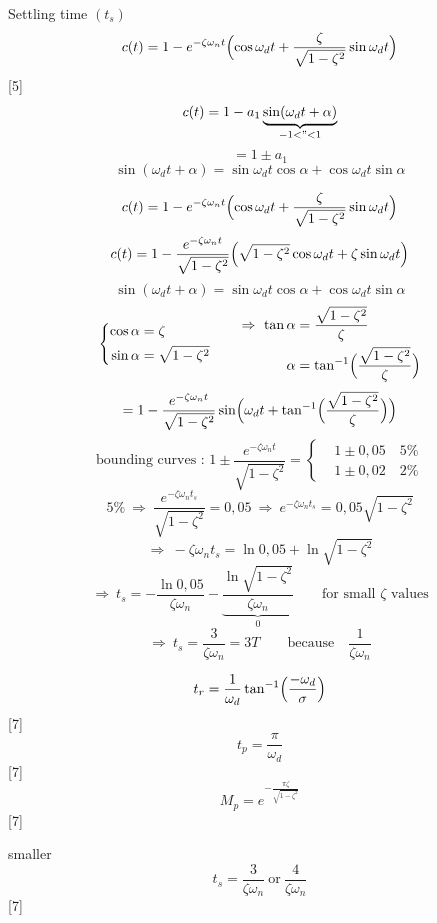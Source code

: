 \documentclass[11pt,a4paper]{article}
\begin{document}
Settling time $(t_s)$
\[ c(t)=1-e^{-\zeta\omega_n t}\Bigl(\cos\omega_d t+\frac{\zeta}{\sqrt{1-\zeta^2}}\sin\omega_d t\Bigr) \]
[5]
\[ c(t)=1-a_1\underbrace{\sin(\omega_d t+\alpha)}_{-1<\text{\textquotedblright}<1} \]
\[ =1\pm a_1 \]
\[ \sin(\omega_d t+\alpha)=\sin\omega_d t\cos\alpha+\cos\omega_d t\sin\alpha \]

\[ c(t)=1-e^{-\zeta\omega_n t}\Bigl(\cos\omega_d t+\frac{\zeta}{\sqrt{1-\zeta^2}}\sin\omega_d t\Bigr) \]
\[ c(t)=1-\frac{e^{-\zeta\omega_n t}}{\sqrt{1-\zeta^2}}\Bigl(\sqrt{1-\zeta^2}\cos\omega_d t+\zeta\sin\omega_d t\Bigr) \]
\[ \sin(\omega_d t+\alpha)=\sin\omega_d t\cos\alpha+\cos\omega_d t\sin\alpha \]
\[ \left\{\begin{aligned}\cos\alpha&=\zeta\\ \sin\alpha&=\sqrt{1-\zeta^2}\end{aligned}\right.\qquad \begin{aligned}\Rightarrow\ \tan\alpha&=\frac{\sqrt{1-\zeta^2}}{\zeta}\\ \alpha&=\tan^{-1}\Bigl(\frac{\sqrt{1-\zeta^2}}{\zeta}\Bigr)\end{aligned} \]
\[ =1-\frac{e^{-\zeta\omega_n t}}{\sqrt{1-\zeta^2}}\sin\Bigl(\omega_d t+\tan^{-1}\Bigl(\frac{\sqrt{1-\zeta^2}}{\zeta}\Bigr)\Bigr) \]
\[ \text{bounding curves : }1\pm\frac{e^{-\zeta\omega_n t}}{\sqrt{1-\zeta^2}}=\left\{\begin{aligned}&1\pm 0{,}05\quad 5\%\\ &1\pm 0{,}02\quad 2\%\end{aligned}\right. \]
\[ 5\%\ \Rightarrow\ \frac{e^{-\zeta\omega_n t_s}}{\sqrt{1-\zeta^2}}=0{,}05\ \Rightarrow\ e^{-\zeta\omega_n t_s}=0{,}05\sqrt{1-\zeta^2} \]
\[ \Rightarrow\ -\zeta\omega_n t_s=\ln 0{,}05+\ln\sqrt{1-\zeta^2} \]
\[ \Rightarrow\ t_s=-\frac{\ln 0{,}05}{\zeta\omega_n}-\underbrace{\frac{\ln\sqrt{1-\zeta^2}}{\zeta\omega_n}}_{0}\qquad\text{for small }\zeta\text{ values} \]
\[ \Rightarrow\ t_s=\frac{3}{\zeta\omega_n}=3T\qquad\text{because}\quad\frac{1}{\zeta\omega_n} \]

\[ t_r=\frac{1}{\omega_d}\tan^{-1}\Bigl(\frac{-\omega_d}{\sigma}\Bigr) \]
[7]
\[ t_p=\frac{\pi}{\omega_d} \]
[7]
\[ M_p=e^{-\frac{\pi\zeta}{\sqrt{1-\zeta^2}}} \]
[7]

smaller
\[ t_s=\frac{3}{\zeta\omega_n}\ \text{or}\ \frac{4}{\zeta\omega_n} \]
[7]
\end{document}
